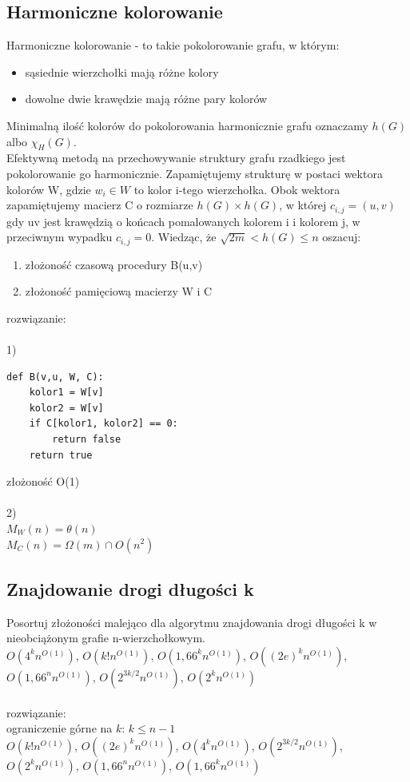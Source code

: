 \documentclass{article}
\begin{document}
\subsection*{Harmoniczne kolorowanie}
Harmoniczne kolorowanie - to takie pokolorowanie grafu,  w którym:
\begin{itemize}
	\item sąsiednie wierzchołki mają różne kolory
	\item dowolne dwie krawędzie mają różne pary kolorów
\end{itemize}
Minimalną ilość kolorów do pokolorowania harmonicznie grafu oznaczamy $h(G)$ albo $\chi_H(G)$.  \\
Efektywną metodą na przechowywanie struktury grafu rzadkiego jest pokolorowanie go harmonicznie. 
Zapamiętujemy strukturę w postaci wektora kolorów W, gdzie $w_i \in W$ to kolor i-tego wierzchołka.
Obok wektora zapamiętujemy macierz C o rozmiarze $h(G) \times h(G)$, w której $c_{i,j} = (u,v)$ gdy uv
jest krawędzią o końcach pomalowanych kolorem i i kolorem j, w przeciwnym wypadku $c_{i,j} = 0$. 
Wiedząc, że $\sqrt{2m} < h(G) \leq n$ oszacuj:
\begin{enumerate}
	\item złożoność czasową procedury B(u,v) 
	\item złożoność pamięciową macierzy W i C
\end{enumerate}
rozwiązanie: \\\\
1)
\begin{lstlisting}
def B(v,u, W, C):
	kolor1 = W[v]
	kolor2 = W[v]
	if C[kolor1, kolor2] == 0:
		return false
	return true	
\end{lstlisting}
złożoność O(1) \\\\
2)\\
$M_W(n) = \theta(n)$ \\
$M_C(n) = \Omega(m) \cap O(n^2)$

\subsection*{Znajdowanie drogi długości k}
Posortuj złożoności malejąco dla algorytmu znajdowania drogi długości k w nieobciążonym grafie n-wierzchołkowym. \\
$O(4^k n^{O(1)})$, $O(k! n^{O(1)})$, $O(1,66^k n^{O(1)})$, $O((2e)^k n^{O(1)})$, $O(1,66^n n^{O(1)})$, $O(2^{3k/2} n^{O(1)})$, $O(2^k n^{O(1)})$ \\\\rozwiązanie:\\
ograniczenie górne na $k$: $k \leq n-1$ \\
$O(k! n^{O(1)})$, $O((2e)^k n^{O(1)})$, $O(4^k n^{O(1)})$, $O(2^{3k/2} n^{O(1)})$, $O(2^k n^{O(1)})$,  $O(1,66^n n^{O(1)})$, $O(1,66^k n^{O(1)})$
\end{document}
